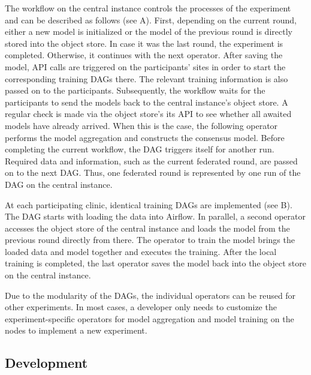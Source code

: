 The workflow on the central instance controls the processes of the experiment and can be described as follows (see  A).
First, depending on the current round, either a new model is initialized  or the model of the previous round is directly stored into the object store.
In case it was the last round, the experiment is completed. Otherwise, it continues with the next operator.
After saving the model, API calls are triggered on the participants' sites in order to start the corresponding training DAGs there. The relevant training information is also passed on to the participants. Subsequently, the workflow waits for the participants to send the models back to the central instance's object store. A regular check is made via the object store's its API to see whether all awaited models have already arrived.
When this is the case, the following operator performs the model aggregation and constructs the consensus model.
Before completing the current workflow, the DAG triggers itself for another run. Required data and information, such as the current federated round, are passed on to the next DAG. Thus, one federated round is represented by one run of the DAG on the central instance.

At each participating clinic, identical training DAGs are implemented (see  B).
The DAG starts with loading the data into Airflow. In parallel, a second operator accesses the object store of the central instance and loads the model from the previous round directly from there.
The operator to train the model brings the loaded data and model together and executes the training. After the local training is completed, the last operator saves the model back into the object store on the central instance.

Due to the modularity of the DAGs, the individual operators can be reused for other experiments. In most cases, a developer only needs to customize the experiment-specific operators for model aggregation and model training on the nodes to implement a new experiment.


\subsection{Development}
\label{subsec:Development} 

